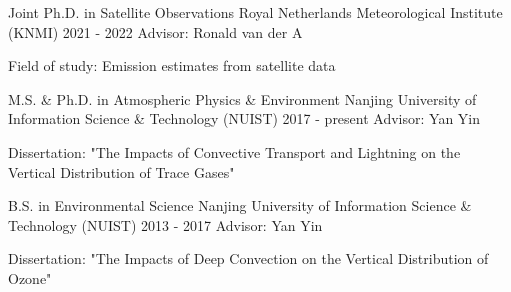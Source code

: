 

\begin{cventries}

  \cventry
    {Joint Ph.D. in Satellite Observations} %
    {Royal Netherlands Meteorological Institute (KNMI)} %
    {2021 - 2022} %
    {Advisor: Ronald van der A} %
    {
      \begin{cvitems} %
        \item {Field of study: Emission estimates from satellite data}
      \end{cvitems}
    }

  \cventry
    {M.S. \& Ph.D. in Atmospheric Physics \& Environment} %
    {Nanjing University of Information Science \& Technology (NUIST)} %
    {2017 - present} %
    {Advisor: Yan Yin} %
    {
      \begin{cvitems} %
        \item {Dissertation: "The Impacts of Convective Transport and Lightning on the Vertical Distribution of Trace Gases"}
      \end{cvitems}
    }

  \cventry
    {B.S. in Environmental Science} %
    {Nanjing University of Information Science \& Technology (NUIST)} %
    {2013 - 2017} %
    {Advisor: Yan Yin} %
    {
      \begin{cvitems} %
        \item {Dissertation: "The Impacts of Deep Convection on the Vertical Distribution of Ozone"}
      \end{cvitems}
    }


\end{cventries}

